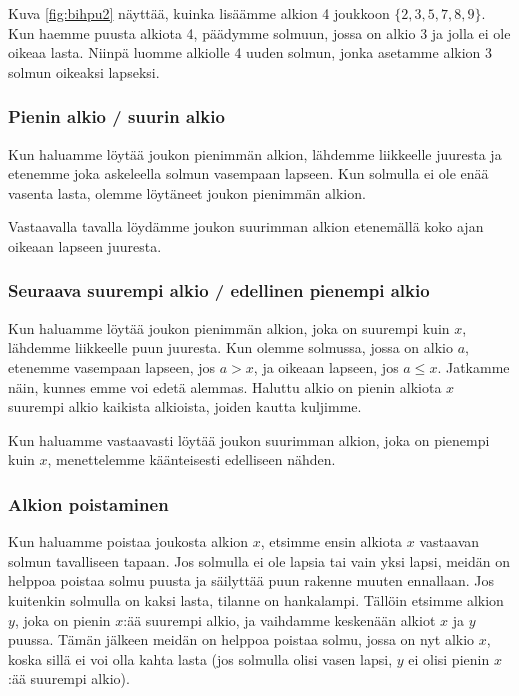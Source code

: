 Kuva \ref{fig:bihpu2} näyttää, kuinka lisäämme alkion 4
joukkoon $\{2,3,5,7,8,9\}$.
Kun haemme puusta alkiota 4, päädymme solmuun,
jossa on alkio 3 ja jolla ei ole oikeaa lasta.
Niinpä luomme alkiolle 4 uuden solmun, jonka asetamme
alkion 3 solmun oikeaksi lapseksi.

\subsubsection{Pienin alkio / suurin alkio}

Kun haluamme löytää joukon pienimmän alkion,
lähdemme liikkeelle juuresta ja etenemme joka askeleella
solmun vasempaan lapseen.
Kun solmulla ei ole enää vasenta lasta,
olemme löytäneet joukon pienimmän alkion.

Vastaavalla tavalla löydämme joukon suurimman alkion
etenemällä koko ajan oikeaan lapseen juuresta.

\subsubsection{Seuraava suurempi alkio / edellinen pienempi alkio}

Kun haluamme löytää joukon pienimmän alkion,
joka on suurempi kuin $x$,
lähdemme liikkeelle puun juuresta.
Kun olemme solmussa, jossa on alkio $a$,
etenemme vasempaan lapseen,
jos $a>x$, ja oikeaan lapseen, jos $a \le x$.
Jatkamme näin, kunnes emme voi edetä alemmas.
Haluttu alkio on pienin alkiota $x$ suurempi alkio
kaikista alkioista, joiden kautta kuljimme.

Kun haluamme vastaavasti löytää joukon suurimman alkion,
joka on pienempi kuin $x$,
menettelemme käänteisesti edelliseen nähden.

\subsubsection{Alkion poistaminen}

Kun haluamme poistaa joukosta alkion $x$, etsimme ensin
alkiota $x$ vastaavan solmun tavalliseen tapaan.
Jos solmulla ei ole lapsia tai vain yksi lapsi,
meidän on helppoa poistaa solmu puusta ja säilyttää
puun rakenne muuten ennallaan.
Jos kuitenkin solmulla on kaksi lasta,
tilanne on hankalampi.
Tällöin etsimme alkion $y$,
joka on pienin $x$:ää suurempi alkio,
ja vaihdamme keskenään alkiot $x$ ja $y$ puussa.
Tämän jälkeen meidän on helppoa poistaa solmu,
jossa on nyt alkio $x$,
koska sillä ei voi olla kahta lasta
(jos solmulla olisi vasen lapsi,
$y$ ei olisi pienin $x$:ää suurempi alkio).

